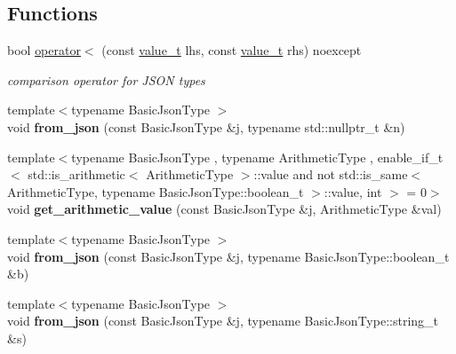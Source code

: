 \subsection*{Functions}
\begin{DoxyCompactItemize}
\item 
bool \mbox{\hyperlink{namespacenlohmann_1_1detail_a09169efff3bd1771fff29bd92cea19e0}{operator$<$}} (const \mbox{\hyperlink{namespacenlohmann_1_1detail_a1ed8fc6239da25abcaf681d30ace4985}{value\+\_\+t}} lhs, const \mbox{\hyperlink{namespacenlohmann_1_1detail_a1ed8fc6239da25abcaf681d30ace4985}{value\+\_\+t}} rhs) noexcept
\begin{DoxyCompactList}\small\item\em comparison operator for J\+S\+ON types \end{DoxyCompactList}\item 
\mbox{\label{namespacenlohmann_1_1detail_a1f0395aad0fe853a4539288749d3a603}} 
{\footnotesize template$<$typename Basic\+Json\+Type $>$ }\\void {\bfseries from\+\_\+json} (const Basic\+Json\+Type \&j, typename std\+::nullptr\+\_\+t \&n)
\item 
\mbox{\label{namespacenlohmann_1_1detail_a85955b9c6dd31846e4b8e891f78614b6}} 
{\footnotesize template$<$typename Basic\+Json\+Type , typename Arithmetic\+Type , enable\+\_\+if\+\_\+t$<$ std\+::is\+\_\+arithmetic$<$ Arithmetic\+Type $>$\+::value and not std\+::is\+\_\+same$<$ Arithmetic\+Type, typename Basic\+Json\+Type\+::boolean\+\_\+t $>$\+::value, int $>$  = 0$>$ }\\void {\bfseries get\+\_\+arithmetic\+\_\+value} (const Basic\+Json\+Type \&j, Arithmetic\+Type \&val)
\item 
\mbox{\label{namespacenlohmann_1_1detail_a58117f225f43d03e3a0a4a6f3d77c9d9}} 
{\footnotesize template$<$typename Basic\+Json\+Type $>$ }\\void {\bfseries from\+\_\+json} (const Basic\+Json\+Type \&j, typename Basic\+Json\+Type\+::boolean\+\_\+t \&b)
\item 
\mbox{\label{namespacenlohmann_1_1detail_ad74d89f77ada7a57eff38b43d4bf2335}} 
{\footnotesize template$<$typename Basic\+Json\+Type $>$ }\\void {\bfseries from\+\_\+json} (const Basic\+Json\+Type \&j, typename Basic\+Json\+Type\+::string\+\_\+t \&s)

\end{DoxyCompactItemize}
